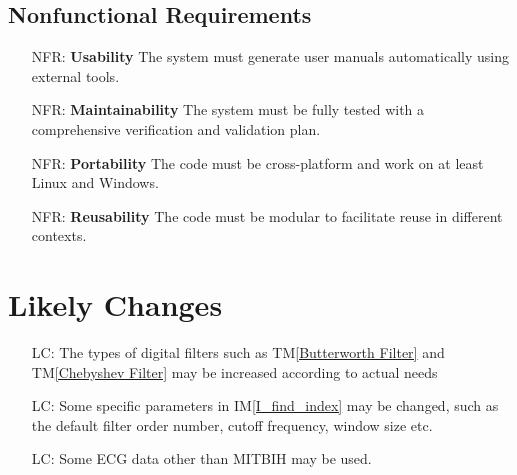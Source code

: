 \documentclass[12pt]{article}
\newcommand{\tref}[1]{TM\ref{#1}} \newcounter{tablenum} %
\newcommand{\iref}[1]{IM\ref{#1}} \newcounter{reqnum} %
\begin{document}
\subsection{Nonfunctional Requirements}

\noindent \begin{itemize}

\item[NFR\refstepcounter{nfrnum}\thenfrnum \label{NFR_Usability}:]
  \textbf{Usability} The system must generate user manuals automatically using
  external tools.

\item[NFR\refstepcounter{nfrnum}\thenfrnum \label{NFR_Maintainability}:]
  \textbf{Maintainability} The system must be fully tested with a comprehensive
  verification and validation plan.

\item[NFR\refstepcounter{nfrnum}\thenfrnum \label{NFR_Portability}:]
  \textbf{Portability} The code must be cross-platform and work on at least
  Linux and Windows.

\item[NFR\refstepcounter{nfrnum}\thenfrnum \label{NFR_Reusability}:]
  \textbf{Reusability} The code must be modular to facilitate reuse in different
  contexts.

\end{itemize}



\section{Likely Changes}    

\noindent \begin{itemize}

\item[LC\refstepcounter{lcnum}\thelcnum\label{LC_filters}:] The types of digital
filters such as \tref{Butterworth Filter} and \tref{Chebyshev Filter} may be
increased according to actual needs

\item[LC\refstepcounter{lcnum}\thelcnum\label{LC_parameters}:] Some specific
parameters in \iref{I_find_index} may be changed, such as the default filter
order number, cutoff frequency, window size etc.

\item[LC\refstepcounter{lcnum}\thelcnum\label{LC_database}:] Some ECG data other
than MITBIH may be used.

\end{itemize}
\end{document}
